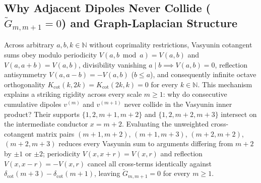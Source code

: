 \documentclass[11pt,a4paper]{article}
\theoremstyle{definition}
\newcommand{\N}{\mathbb{N}}
\begin{document}
\subsection{Why Adjacent Dipoles Never Collide ($\widetilde{G}_{m, m+1} = 0$) and Graph-Laplacian Structure}

Across arbitrary $a, b, k \in \N$ without coprimality restrictions, Vasyunin cotangent sums obey modulo periodicity $V(a, b \bmod a) = V(a, b)$ and $V(a, a+b) = V(a, b)$, divisibility vanishing $a \mid b \implies V(a, b) = 0$, reflection antisymmetry $V(a, a-b) = -V(a,b)$ ($b \le a$), and consequently infinite octave orthogonality $K_{\mathrm{cot}}(k, 2k) = K_{\mathrm{cot}}(2k, k) = 0$ for every $k \in \N$. This mechanism explains a striking rigidity across every scale $m \ge 1$: why do consecutive cumulative dipoles $v^{(m)}$ and $v^{(m+1)}$ never collide in the Vasyunin inner product? Their supports $\{1,2,m+1,m+2\}$ and $\{1,2,m+2,m+3\}$ intersect on the intermediate conductor $x = m+2$. Evaluating the unweighted cross-cotangent matrix pairs $(m+1, m+2)$, $(m+1, m+3)$, $(m+2, m+2)$, $(m+2, m+3)$ reduces every Vasyunin sum to arguments differing from $m+2$ by $\pm 1$ or $\pm 2$; periodicity $V(x, x+r) = V(x, r)$ and reflection $V(x, x-r) = -V(x, r)$ cancel all cross-terms identically against $\delta_{\mathrm{cot}}(m+3)-\delta_{\mathrm{cot}}(m+1)$, leaving $\widetilde{G}_{m, m+1} = 0$ for every $m \ge 1$.
\end{document}
